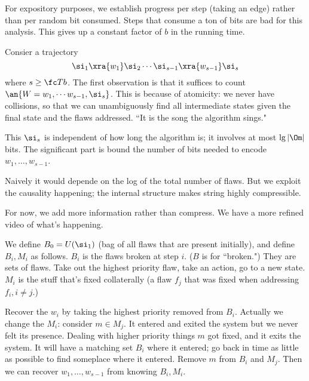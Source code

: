 For expository purposes, we establish progress per step (taking an edge) rather than per random bit consumed. Steps that consume a ton of bits are bad for this analysis. This gives up a constant factor of $b$ in the running time. 

Consier a trajectory 
\[\si_1\xra{w_1}\si_2\cdots \si_{s-1}\xra{w_{s-1}}\si_s\]
where $s\ge \fc Tb$. The first observation is that it suffices to count $\an{W=w_1,\cdots w_{s-1},\si_s}$. This is because of atomicity: we never have collisions, so that we can unambiguously find all intermediate states given the final state and the flaws addressed. ``It is the song the algorithm sings."

This $\si_s$ is independent of how long the algorithm is; it involves at most $\lg|\Om|$ bits. The significant part is bound the number of bits needed to encode $w_1,\ldots, w_{s-1}$.

Naively it would depende on the log of the total number of flaws. But we exploit the causality happening; the internal structure makes string highly compressible.

For now, we add more information rather than compress. We have a more refined video of what's happening.

We define $B_0=U(\si_1)$ (bag of all flaws that are present initially), and define $B_i,M_i$ as follows. $B_i$ is the flaws broken at step $i$. ($B$ is for ``broken.") They are sets of flaws. Take out the highest priority flaw, take an action, go to a new state. $M_i$ is the stuff that's fixed collaterally (a flaw $f_j$ that was fixed when addressing $f_i,i\ne j$.)

Recover the $w_i$ by taking the highest priority removed from $B_i$.
Actually we change the $M_i$: consider $m\in M_j$. It entered and exited the system but we never felt its presence. Dealing with higher priority things $m$ got fixed, and it exits the system. It will have a matching set $B_i$ where it entered; go back in time as little as possible to find someplace where it entered. 
Remove $m$ from $B_i$ and $M_j$. Then we can recover $w_1,\ldots, w_{s-1}$ from knowing $B_i,M_i$.

